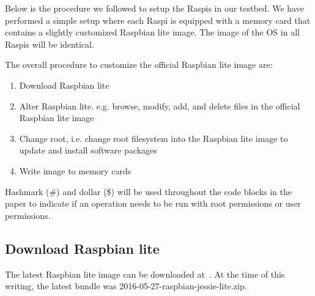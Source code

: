 Below is the procedure we followed to setup the \ac{Raspi}s in our testbed. We
%
have performed a simple setup where each \ac{Raspi} is equipped with a
memory card that contains a slightly customized Raspbian lite image. The image
of the \ac{OS} in all \ac{Raspi}s will be identical.


The overall procedure to customize the official Raspbian lite image
are:
\begin{enumerate}
    \item Download Raspbian lite
    \item Alter Raspbian lite. e.g. browse, modify, add, and delete files
        in the official Raspbian lite image
    \item Change root, i.e. change root filesystem into the Raspbian lite
        image to update and install software packages
    \item Write image to memory cards
\end{enumerate}

Hashmark (\#) and dollar (\$) will be used throughout the code blocks in
the paper to indicate if an operation needs to be run with root permissions or
user permissions.

\subsection{Download Raspbian lite}

The latest Raspbian lite image can be downloaded at~\cite{raspbian}.
At the time of this writing, the latest bundle was
2016-05-27-raspbian-jessie-lite.zip.

